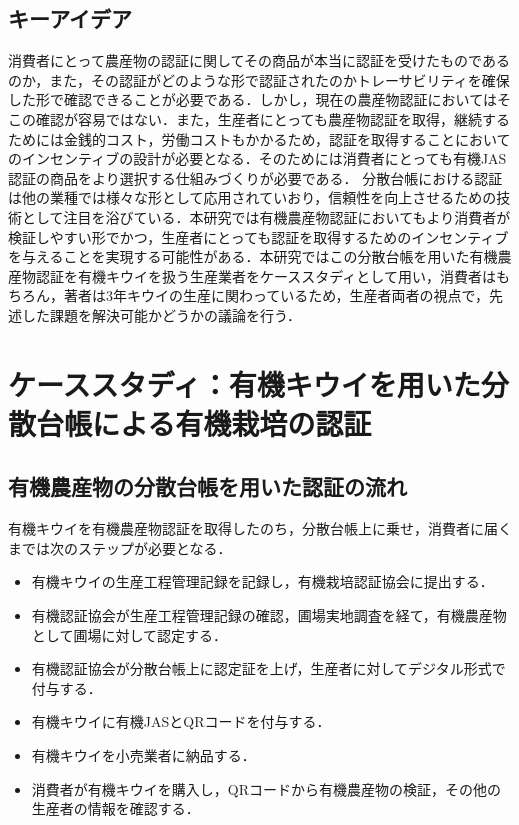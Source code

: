 \documentclass[11pt,dvipdfmx]{jreport}
\begin{document}
\section{キーアイデア}
消費者にとって農産物の認証に関してその商品が本当に認証を受けたものであるのか，また，その認証がどのような形で認証されたのかトレーサビリティを確保した形で確認できることが必要である．しかし，現在の農産物認証においてはそこの確認が容易ではない．また，生産者にとっても農産物認証を取得，継続するためには金銭的コスト，労働コストもかかるため，認証を取得することにおいてのインセンティブの設計が必要となる．そのためには消費者にとっても有機JAS認証の商品をより選択する仕組みづくりが必要である．
分散台帳における認証は他の業種では様々な形として応用されていおり，信頼性を向上させるための技術として注目を浴びている．本研究では有機農産物認証においてもより消費者が検証しやすい形でかつ，生産者にとっても認証を取得するためのインセンティブを与えることを実現する可能性がある．本研究ではこの分散台帳を用いた有機農産物認証を有機キウイを扱う生産業者をケーススタディとして用い，消費者はもちろん，著者は3年キウイの生産に関わっているため，生産者両者の視点で，先述した課題を解決可能かどうかの議論を行う．

\chapter{ケーススタディ：有機キウイを用いた分散台帳による有機栽培の認証}

\section{有機農産物の分散台帳を用いた認証の流れ}
 有機キウイを有機農産物認証を取得したのち，分散台帳上に乗せ，消費者に届くまでは次のステップが必要となる．
 
\begin{itemize}
  \item 有機キウイの生産工程管理記録を記録し，有機栽培認証協会に提出する．
  \item 有機認証協会が生産工程管理記録の確認，圃場実地調査を経て，有機農産物として圃場に対して認定する．
  \item 有機認証協会が分散台帳上に認定証を上げ，生産者に対してデジタル形式で付与する．
  \item 有機キウイに有機JASとQRコードを付与する．
  \item 有機キウイを小売業者に納品する．
  \item 消費者が有機キウイを購入し，QRコードから有機農産物の検証，その他の生産者の情報を確認する．
\end{itemize}
\end{document}
